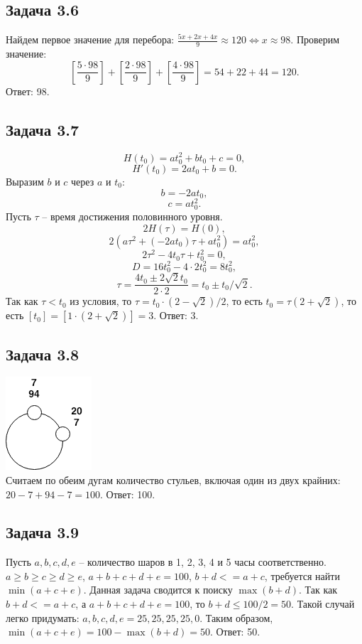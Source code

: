 \documentclass[12pt]{article}
\begin{document}
\subsection*{Задача 3.6}
Найдем первое значение для перебора: $\frac{5x+2x+4x}{9}\approx120 \Leftrightarrow x \approx 98$. Проверим значение: $$\left[\frac{5\cdot98}{9}\right] + \left[\frac{2\cdot98}{9}\right] + \left[\frac{4\cdot98}{9}\right] = 54 + 22 + 44 = 120.$$
Ответ: 98.

\subsection*{Задача 3.7}
$$H(t_0) = at_0^2 + bt_0 + c = 0,$$
$$H'(t_0) = 2at_0 + b = 0.$$
Выразим $b$ и $c$ через $a$ и $t_0$:
$$b = -2at_0,$$
$$c = at_0^2.$$
Пусть $\tau$ -- время достижения половинного уровня.
$$2H(\tau) = H(0),$$
$$2(a\tau^2 + (-2at_0)\tau+at_0^2) = at_0^2,$$
$$2\tau^2 - 4t_0\tau + t_0^2 = 0,$$
$$D = 16t_0^2 - 4\cdot 2t_0^2 = 8t_0^2,$$
$$\tau = \frac{4t_0\pm 2\sqrt{2}t_0}{2\cdot 2}=t_0\pm t_0/\sqrt{2}.$$
Так как $\tau < t_0$ из условия, то $\tau = t_0\cdot(2 -\sqrt{2})/2$, то есть $t_0 = \tau(2 + \sqrt{2})$, то есть $[t_0] = [1\cdot(2 + \sqrt{2})] = 3.$
Ответ: 3.

\subsection*{Задача 3.8}
\includegraphics{math38}\\
Считаем по обеим дугам количество стульев, включая один из двух крайних: $20 - 7 + 94 - 7 = 100$.
Ответ: 100.

\subsection*{Задача 3.9}
Пусть $a, b, c, d, e$ -- количество шаров в 1, 2, 3, 4 и 5 часы соответственно.
$a\geq b\geq c\geq d\geq e$, $a+b+c+d+e=100$, $b+d<=a+c$, требуется найти $\min{(a + c + e)}$. Данная задача сводится к поиску $\max{(b + d)}$. Так как $b+d<=a+c$, а $a+b+c+d+e=100$, то $b+d\leq 100/2 = 50$. Такой случай легко придумать: $a, b, c, d, e = 25, 25, 25, 25, 0$. Таким образом, $\min{(a + c + e)} = 100 - \max{(b + d)} = 50$.
Ответ: 50.
\end{document}
